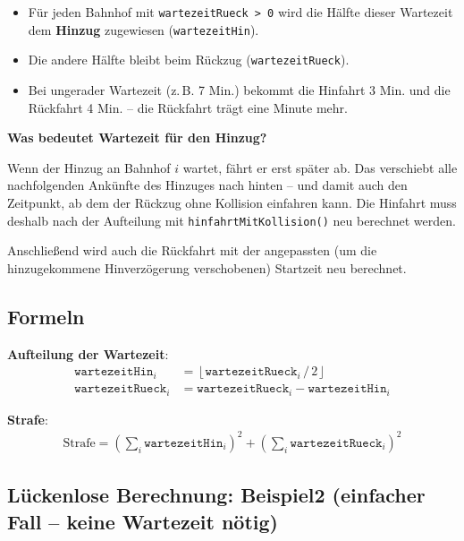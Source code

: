 \documentclass[12pt,a4paper]{article}
\begin{document}
\begin{itemize}
    \item Für jeden Bahnhof mit \texttt{wartezeitRueck > 0} wird die Hälfte dieser Wartezeit dem \textbf{Hinzug} zugewiesen (\texttt{wartezeitHin}).
    \item Die andere Hälfte bleibt beim Rückzug (\texttt{wartezeitRueck}).
    \item Bei ungerader Wartezeit (z.\,B. 7 Min.) bekommt die Hinfahrt 3 Min. und die Rückfahrt 4 Min. -- die Rückfahrt trägt eine Minute mehr.
\end{itemize}

\textbf{Was bedeutet Wartezeit für den Hinzug?}

Wenn der Hinzug an Bahnhof $i$ wartet, fährt er erst später ab. Das verschiebt alle nachfolgenden Ankünfte des Hinzuges nach hinten -- und damit auch den Zeitpunkt, ab dem der Rückzug ohne Kollision einfahren kann. Die Hinfahrt muss deshalb nach der Aufteilung mit \texttt{hinfahrtMitKollision()} neu berechnet werden.

Anschließend wird auch die Rückfahrt mit der angepassten (um die hinzugekommene Hinverzögerung verschobenen) Startzeit neu berechnet.

\subsection{Formeln}

\textbf{Aufteilung der Wartezeit}:
\begin{align*}
\texttt{wartezeitHin}_i &= \left\lfloor \texttt{wartezeitRueck}_i \,/\, 2 \right\rfloor \\
\texttt{wartezeitRueck}_i &= \texttt{wartezeitRueck}_i - \texttt{wartezeitHin}_i
\end{align*}

\textbf{Strafe}:
\begin{align*}
    \text{Strafe} = \left(\sum_i \texttt{wartezeitHin}_i\right)^2 + \left(\sum_i \texttt{wartezeitRueck}_i\right)^2
\end{align*}

\subsection{Lückenlose Berechnung: Beispiel2 (einfacher Fall -- keine Wartezeit nötig)}
\end{document}
